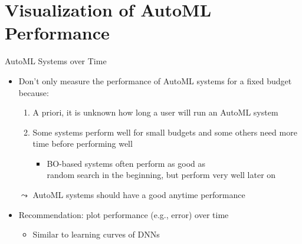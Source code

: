 \section{Visualization of AutoML Performance}
\begin{frame}[c]{AutoML Systems over Time}

\begin{itemize}
	\item Don't only measure the performance of AutoML systems for a fixed budget because:
	\begin{enumerate}
	   \item A priori, it is unknown how long a user will run an AutoML system
	   \item Some systems perform well for small budgets and some others need more time before performing well
	   \begin{itemize}
	   	\item BO-based systems often perform as good as\\ random search in the beginning, but perform very well later on
	   \end{itemize}
    \end{enumerate}
	\pause
	\item[$\leadsto$] AutoML systems should have a good anytime performance
	\pause
	\medskip
	\item Recommendation: plot performance (e.g., error) over time
	\begin{itemize}
		\item Similar to learning curves of DNNs 
	\end{itemize} 
\end{itemize}


\end{frame}
